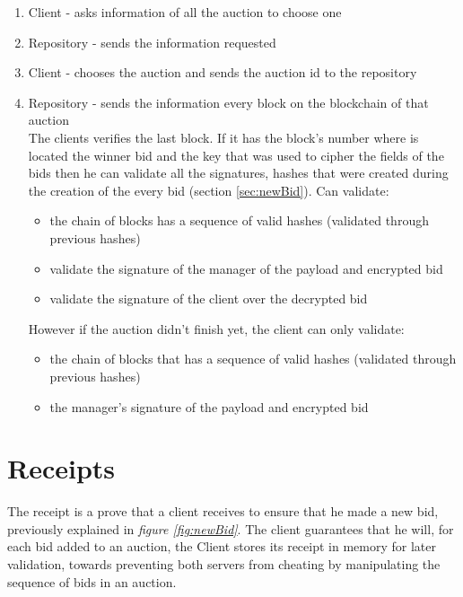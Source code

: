 \documentclass[12pt]{article}
\begin{document}
\begin{enumerate}
    \item Client - asks information of all the auction to choose one
    \item Repository - sends the information requested
    \item Client - chooses the auction and sends the auction id to the repository
    \item Repository - sends the information every block on the blockchain of that auction \\
      The clients verifies the last block. If it has the block's number where is located the winner bid and the key that
      was used to cipher the fields of the bids then he can validate all the signatures, hashes 
      that were created during the creation of the every bid (section \ref{sec:newBid}). Can validate:
      \begin{itemize}
        \item the chain of blocks has a sequence of valid hashes (validated through previous hashes)
        \item validate the signature of the manager of the payload and encrypted bid
        \item validate the signature of the client over the decrypted bid
      \end{itemize}
      However if the auction didn't finish yet, the client can only validate:
      \begin{itemize}
        \item the chain of blocks that has a sequence of valid hashes (validated through previous hashes)
        \item the manager's signature of the payload and encrypted bid
      \end{itemize}

\end{enumerate}
\vspace{20mm}

\section{Receipts}
\label{sec:receipts}

The receipt is a prove that a client receives to ensure that he made a new bid, previously explained 
  in \textit{figure \ref{fig:newBid}}. The client guarantees that he will, for each bid added to an auction, 
  the Client stores its receipt in  memory for later validation, towards preventing both servers from cheating by manipulating the sequence of bids in an auction.
\vspace{30mm}
\end{document}
